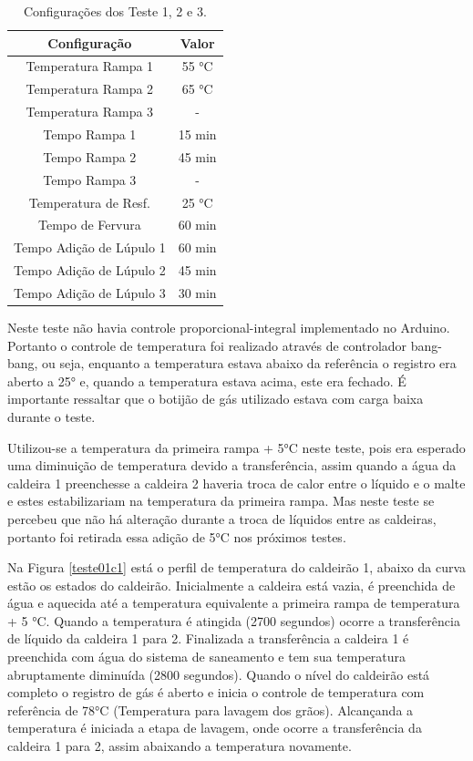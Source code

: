 \begin{table}[]
\centering
\caption{Configurações dos Teste 1, 2 e 3.}
\label{Configuracoes}
\begin{tabular}{cc}
\hline
\textbf{Configuração}    & \textbf{Valor} \\ \hline
Temperatura Rampa 1      & 55 °C          \\ \hline
Temperatura Rampa 2      & 65 °C          \\ \hline
Temperatura Rampa 3      & -              \\ \hline
Tempo Rampa 1            & 15 min         \\ \hline
Tempo Rampa 2            & 45 min         \\ \hline
Tempo Rampa 3            & -              \\ \hline
Temperatura de Resf.     & 25 °C          \\ \hline
Tempo de Fervura         & 60 min         \\ \hline
Tempo Adição de Lúpulo 1 & 60 min         \\ \hline
Tempo Adição de Lúpulo 2 & 45 min         \\ \hline
Tempo Adição de Lúpulo 3 & 30 min         \\ \hline
\end{tabular}
\end{table}

Neste teste não havia controle proporcional-integral implementado no Arduino. Portanto o controle de temperatura foi realizado através de controlador bang-bang, ou seja, enquanto a temperatura estava abaixo da referência o registro era aberto a 25° e, quando a temperatura estava acima, este era fechado. É importante ressaltar que o botijão de gás utilizado estava com carga baixa durante o teste.

Utilizou-se a temperatura da primeira rampa + 5°C neste teste, pois era esperado uma diminuição de temperatura devido a transferência, assim quando a água da caldeira 1 preenchesse a caldeira 2 haveria troca de calor entre o líquido e o malte e estes estabilizariam na temperatura da primeira rampa. Mas neste teste se percebeu que não há alteração durante a troca de líquidos entre as caldeiras, portanto foi retirada essa adição de 5°C nos próximos testes. 

Na Figura \ref{teste01c1} está o perfil de temperatura do caldeirão 1, abaixo da curva estão os estados do caldeirão. Inicialmente a caldeira está vazia, é preenchida de água e aquecida até a temperatura equivalente a primeira rampa de temperatura + 5 °C. Quando a temperatura é atingida (2700 segundos) ocorre a transferência de líquido da caldeira 1 para 2. Finalizada a transferência a caldeira 1 é preenchida com água do sistema de saneamento e tem sua temperatura abruptamente diminuída (2800 segundos). Quando o nível do caldeirão está completo o registro de gás é aberto e inicia o controle de temperatura com referência de 78°C (Temperatura para lavagem dos grãos). Alcançanda a temperatura é iniciada a etapa de lavagem, onde ocorre a transferência da caldeira 1 para 2, assim abaixando a temperatura novamente.


